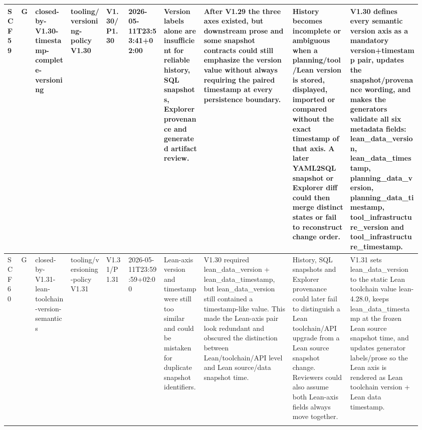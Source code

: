 \begin{longtable}{L{0.03\linewidth} L{0.026\linewidth} L{0.087\linewidth} L{0.085\linewidth} L{0.052\linewidth} L{0.085\linewidth} L{0.095\linewidth} L{0.205\linewidth} L{0.13\linewidth} L{0.165\linewidth}}
SCF59 & G & closed-by-V1.30-timestamp-complete-versioning & tooling/\allowbreak{}versioning-policy V1.30 & V1.30/\allowbreak{}P1.30 & 2026-05-11T23:53:41+02:00 & Version labels alone are insufficient for reliable history, SQL snapshots, Explorer provenance and generated artifact review. & After V1.29 the three axes existed, but downstream prose and some snapshot contracts could still emphasize the version value without always requiring the paired timestamp at every persistence boundary. & History becomes incomplete or ambiguous when a planning/\allowbreak{}tool/\allowbreak{}Lean version is stored, displayed, imported or compared without the exact timestamp of that axis. A later YAML2SQL snapshot or Explorer diff could then merge distinct states or fail to reconstruct change order. & V1.30 defines every semantic version axis as a mandatory version+timestamp pair, updates the snapshot/\allowbreak{}provenance wording, and makes the generators validate all six metadata fields: lean\_data\_version, lean\_data\_timestamp, planning\_data\_version, planning\_data\_timestamp, tool\_infrastructure\_version and tool\_infrastructure\_timestamp.\\
\hline
\addlinespace[0.24em]
SCF60 & G & closed-by-V1.31-lean-toolchain-version-semantics & tooling/\allowbreak{}versioning-policy V1.31 & V1.31/\allowbreak{}P1.31 & 2026-05-11T23:59:59+02:00 & Lean-axis version and timestamp were still too similar and could be mistaken for duplicate snapshot identifiers. & V1.30 required lean\_data\_version + lean\_data\_timestamp, but lean\_data\_version still contained a timestamp-like value. This made the Lean-axis pair look redundant and obscured the distinction between Lean/\allowbreak{}toolchain/\allowbreak{}API level and Lean source/\allowbreak{}data snapshot time. & History, SQL snapshots and Explorer provenance could later fail to distinguish a Lean toolchain/\allowbreak{}API upgrade from a Lean source snapshot change. Reviewers could also assume both Lean-axis fields always move together. & V1.31 sets lean\_data\_version to the static Lean toolchain value lean-4.28.0, keeps lean\_data\_timestamp at the frozen Lean source snapshot time, and updates generator labels/\allowbreak{}prose so the Lean axis is rendered as Lean toolchain version + Lean data timestamp.\\
\hline
\addlinespace[0.24em]

\end{longtable}
